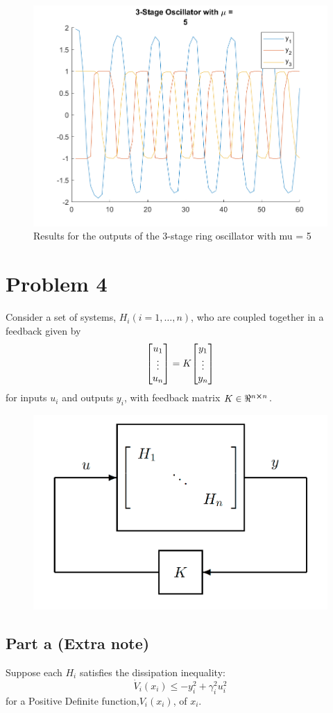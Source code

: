 \documentclass[letter]{article}
\begin{document}
\begin{figure}[p]
	\centering
	\includegraphics[width=0.7\linewidth]{fig/HW6_pblm3_results_mu_5}
	\caption{Results for the outputs of the 3-stage ring oscillator with mu = 5}
	\label{fig:pblm3_mu5}
\end{figure}




\newpage
\newpage
\newpage
\section{Problem 4}
Consider a set of systems, $H_i (i=1,\dots,n)$, who are coupled together in a feedback given by
$$\mqty[u_1\\ \vdots \\ u_n] = K \mqty[y_1\\ \vdots \\ y_n]$$
for inputs $u_i$ and outputs $y_i$, with feedback matrix $K \in \real^{n\cross n}$.

\begin{figure}[h]
	\centering
	\includegraphics[width=0.5\linewidth]{fig/pblm4_given_fig}
	\label{fig:pblm4givenfig}
\end{figure}

\subsection{Part a (Extra note)}
Suppose each $H_i$ satisfies the dissipation inequality:
$$\dot{V}_i(x_i) \leq -y_i^2 + \gamma_i^2 u_i^2$$
for a Positive Definite function,$V_i(x_i)$, of $x_i$.\\
\end{document}
